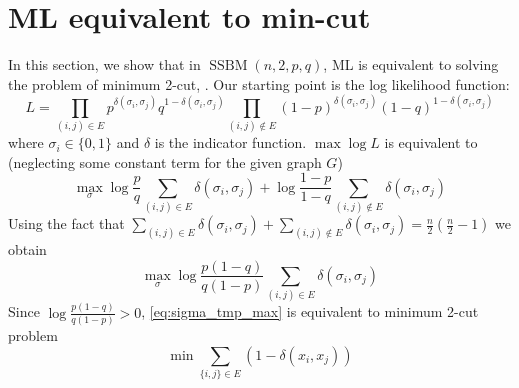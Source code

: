\documentclass{ctexart}
\DeclareMathOperator{\SSBM}{SSBM}
\begin{document}
\section{ML equivalent to min-cut}
In this section, we show that in $\SSBM(n,2,p,q)$,
ML is equivalent to solving the problem of minimum 2-cut,
.
Our starting point is the log likelihood function:
$$
L=\prod_{(i,j) \in E} p^{\delta(\sigma_i, \sigma_j)}q^{1-\delta(\sigma_i, \sigma_j)}
\prod_{(i,j)\not\in E} (1-p)^{\delta(\sigma_i, \sigma_j)}(1-q)^{1-\delta(\sigma_i, \sigma_j)}
$$
where $\sigma_i \in \{0,1\}$ and $\delta$ is the indicator function.
$\max \log L$ is equivalent to (neglecting some constant term for the given graph $G$)
$$
\max_{\sigma}
\log\frac{p}{q}\sum_{(i,j) \in E} \delta(\sigma_i, \sigma_j)
+\log \frac{1-p}{1-q}\sum_{(i,j)\not\in E} \delta(\sigma_i, \sigma_j)
$$
Using the fact that
$\sum_{(i,j) \in E}\delta(\sigma_i, \sigma_j)
+\sum_{(i,j)\not\in E} \delta(\sigma_i, \sigma_j)=\frac{n}{2}(\frac{n}{2}-1)$
we obtain
\begin{equation}\label{eq:sigma_tmp_max}
	\max_{\sigma} \log \frac{p(1-q)}{q(1-p)} \sum_{(i,j) \in E}\delta(\sigma_i, \sigma_j)
\end{equation}
Since $\log \frac{p(1-q)}{q(1-p)}>0$,
\eqref{eq:sigma_tmp_max} is equivalent to minimum 2-cut problem
\begin{equation}\label{eq:minimum_k_cut}
	\min \sum_{ \{i,j\} \in E} (1-\delta(x_i, x_j))
\end{equation}
\end{document}
